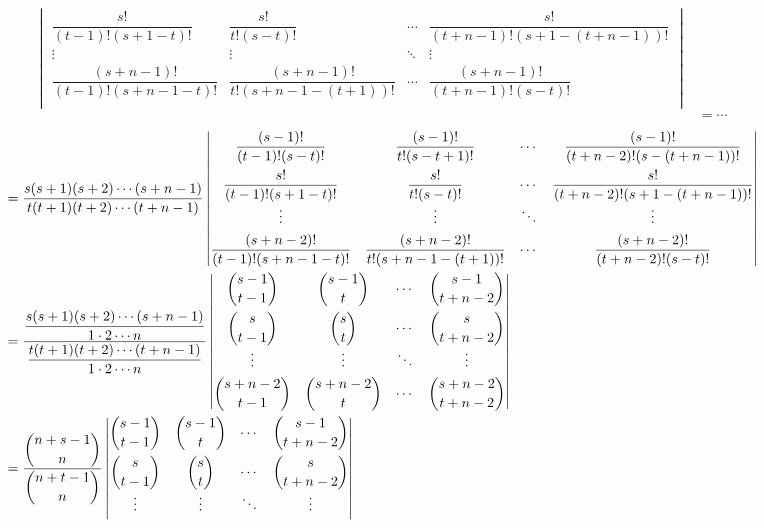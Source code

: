 \documentclass[color=black,device=normal,lang=cn,mode=geye]{elegantnote}
\begin{document}
\begin{landscape}
\begin{solution}
\begin{align*}
\begin{vmatrix}
            \dfrac{s!}{(t-1)!(s+1-t)!} & \dfrac{s!}{t!(s-t)!} & \cdots & \dfrac{s!}{(t+n-1)!(s+1-(t+n-1))!} \\
            \vdots & \vdots & \ddots & \vdots \\[4pt]
            \dfrac{(s+n-1)!}{(t-1)!(s+n-1-t)!} & \dfrac{(s+n-1)!}{t!(s+n-1-(t+1))!} & \cdots & \dfrac{(s+n-1)!}{(t+n-1)!(s-t)!} \\
        \end{vmatrix} \\
        & =\cdots
    \end{align*}
    \begin{align*}
        & =\dfrac{s(s+1)(s+2)\cdots(s+n-1)}{t(t+1)(t+2)\cdots(t+n-1)}\begin{vmatrix}
            \dfrac{(s-1)!}{(t-1)!(s-t)!} & \dfrac{(s-1)!}{t!(s-t+1)!} & \cdots & \dfrac{(s-1)!}{(t+n-2)!(s-(t+n-1))!} \\[10pt]
            \dfrac{s!}{(t-1)!(s+1-t)!} & \dfrac{s!}{t!(s-t)!} & \cdots & \dfrac{s!}{(t+n-2)!(s+1-(t+n-1))!} \\
            \vdots & \vdots & \ddots & \vdots \\[4pt]
            \dfrac{(s+n-2)!}{(t-1)!(s+n-1-t)!} & \dfrac{(s+n-2)!}{t!(s+n-1-(t+1))!} & \cdots & \dfrac{(s+n-2)!}{(t+n-2)!(s-t)!} \\
        \end{vmatrix} \\
        & =\dfrac{\dfrac{s(s+1)(s+2)\cdots(s+n-1)}{1\cdot2\cdots n}}{\dfrac{t(t+1)(t+2)\cdots(t+n-1)}{1\cdot2\cdots n}}\begin{vmatrix}
            \dbinom{s-1}{t-1} & \dbinom{s-1}{t} & \cdots & \dbinom{s-1}{t+n-2} \\[10pt]
            \dbinom{s}{t-1} & \dbinom{s}{t} & \cdots & \dbinom{s}{t+n-2} \\
            \vdots & \vdots & \ddots & \vdots \\[4pt]
            \dbinom{s+n-2}{t-1} & \dbinom{s+n-2}{t} & \cdots & \dbinom{s+n-2}{t+n-2} \\
        \end{vmatrix} \\
        & =\dfrac{\dbinom{n+s-1}{n}}{\dbinom{n+t-1}{n}}\begin{vmatrix}
            \dbinom{s-1}{t-1} & \dbinom{s-1}{t} & \cdots & \dbinom{s-1}{t+n-2} \\[10pt]
            \dbinom{s}{t-1} & \dbinom{s}{t} & \cdots & \dbinom{s}{t+n-2} \\
            \vdots & \vdots & \ddots & \vdots \\[4pt]

\end{vmatrix}
\end{align*}
\end{solution}
\end{landscape}
\end{document}

